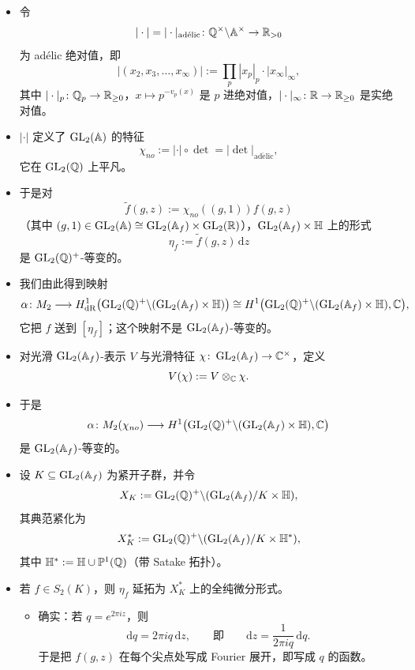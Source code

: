 \begin{itemize}
\item 令
\[
|\cdot|=|\cdot|_{\mathrm{ad\acute{e}lic}}\colon\mathbb{Q}^\times\backslash\mathbb{A}^\times\to\mathbb{R}_{>0}
\]
为 adélic 绝对值，即
\[
|(x_2,x_3,\dots,x_\infty)|:=\prod_p|x_p|_p\cdot|x_\infty|_\infty,
\]
其中 $|\cdot|_p\colon\mathbb{Q}_p\to\mathbb{R}_{\ge0}$，$x\mapsto p^{-v_p(x)}$ 是 $p$ 进绝对值，$|\cdot|_\infty\colon\mathbb{R}\to\mathbb{R}_{\ge0}$ 是实绝对值。
\item $|\cdot|$ 定义了 $\operatorname{GL}_2(\mathbb{A})$ 的特征
\[
\chi_{no}:=|\cdot|\circ\det=|\det|_{\mathrm{ad\acute{e}lic}},
\]
它在 $\operatorname{GL}_2(\mathbb{Q})$ 上平凡。
\item 于是对
\[
\tilde f(g,z):=\chi_{no}((g,1))f(g,z)
\]
（其中 $(g,1)\in\operatorname{GL}_2(\mathbb{A})\cong\operatorname{GL}_2(\mathbb{A}_f)\times\operatorname{GL}_2(\mathbb{R})$），$\operatorname{GL}_2(\mathbb{A}_f)\times\mathbb{H}$ 上的形式
\[
\eta_f:=\tilde f(g,z)\,\mathrm{d}z
\]
是 $\operatorname{GL}_2(\mathbb{Q})^+$-等变的。
\item 我们由此得到映射
\[
\alpha\colon M_2\longrightarrow H^1_{\mathrm{dR}}\bigl(\operatorname{GL}_2(\mathbb{Q})^+\backslash(\operatorname{GL}_2(\mathbb{A}_f)\times\mathbb{H})\bigr)\cong H^1\bigl(\operatorname{GL}_2(\mathbb{Q})^+\backslash(\operatorname{GL}_2(\mathbb{A}_f)\times\mathbb{H}),\mathbb{C}\bigr),
\]
它把 $f$ 送到 $[\eta_f]$；这个映射不是 $\operatorname{GL}_2(\mathbb{A}_f)$-等变的。
\item 对光滑 $\operatorname{GL}_2(\mathbb{A}_f)$-表示 $V$ 与光滑特征 $\chi\colon\operatorname{GL}_2(\mathbb{A}_f)\to\mathbb{C}^\times$，定义
\[
V(\chi):=V\otimes_{\mathbb{C}}\chi .
\]
\item 于是
\[
\alpha\colon M_2(\chi_{no})\longrightarrow H^1\bigl(\operatorname{GL}_2(\mathbb{Q})^+\backslash(\operatorname{GL}_2(\mathbb{A}_f)\times\mathbb{H}),\mathbb{C}\bigr)
\]
是 $\operatorname{GL}_2(\mathbb{A}_f)$-等变的。
\item 设 $K\subseteq\operatorname{GL}_2(\mathbb{A}_f)$ 为紧开子群，并令
\[
X_K:=\operatorname{GL}_2(\mathbb{Q})^+\backslash(\operatorname{GL}_2(\mathbb{A}_f)/K\times\mathbb{H}),
\]
其典范紧化为
\[
X^*_K:=\operatorname{GL}_2(\mathbb{Q})^+\backslash(\operatorname{GL}_2(\mathbb{A}_f)/K\times\mathbb{H}^*),
\]
其中 $\mathbb{H}^*:=\mathbb{H}\cup\mathbb{P}^1(\mathbb{Q})$（带 Satake 拓扑）。
\item 若 $f\in S_2(K)$，则 $\eta_f$ 延拓为 $X^*_K$ 上的全纯微分形式。
\begin{itemize}
\item 确实：若 $q=e^{2\pi iz}$，则
\[
\mathrm{d}q=2\pi iq\,\mathrm{d}z,\qquad\text{即}\qquad \mathrm{d}z=\frac{1}{2\pi iq}\,\mathrm{d}q .
\]
于是把 $f(g,z)$ 在每个尖点处写成 Fourier 展开，即写成 $q$ 的函数。
\end{itemize}


\end{itemize}
